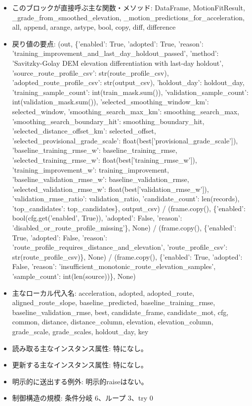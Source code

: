 \documentclass[a4paper,11pt]{article}
\begin{document}
\begin{itemize}[leftmargin=1.6em]
This stage calibrates the route observation, not vehicle mass or resistance.
The selected route stores the unscaled DEM grade. ``grade\_scale`` remains a
separately fitted model coefficient in the following motion fit.
              \item このブロックが直接呼ぶ主な関数・メソッド: DataFrame, MotionFitResult, \_grade\_from\_smoothed\_elevation, \_motion\_predictions\_for\_acceleration, all, append, arange, astype, bool, copy, diff, difference
              \item 戻り値の要点: (out, \{'enabled': True, 'adopted': True, 'reason': 'training\_improvement\_and\_last\_day\_holdout\_passed', 'method': 'Savitzky-Golay DEM elevation differentiation with last-day holdout', 'source\_route\_profile\_csv': str(route\_profile\_csv), 'adopted\_route\_profile\_csv': str(output\_csv), 'holdout\_day': holdout\_day, 'training\_sample\_count': int(train\_mask.sum()), 'validation\_sample\_count': int(validation\_mask.sum()), 'selected\_smoothing\_window\_km': selected\_window, 'smoothing\_search\_max\_km': smoothing\_search\_max, 'smoothing\_search\_boundary\_hit': smoothing\_boundary\_hit, 'selected\_distance\_offset\_km': selected\_offset, 'selected\_provisional\_grade\_scale': float(best['provisional\_grade\_scale']), 'baseline\_training\_rmse\_w': baseline\_training\_rmse, 'selected\_training\_rmse\_w': float(best['training\_rmse\_w']), 'training\_improvement\_w': training\_improvement, 'baseline\_validation\_rmse\_w': baseline\_validation\_rmse, 'selected\_validation\_rmse\_w': float(best['validation\_rmse\_w']), 'validation\_rmse\_ratio': validation\_ratio, 'candidate\_count': len(records), 'top\_candidates': top\_candidates\}, output\_csv) / (frame.copy(), \{'enabled': bool(cfg.get('enabled', True)), 'adopted': False, 'reason': 'disabled\_or\_route\_profile\_missing'\}, None) / (frame.copy(), \{'enabled': True, 'adopted': False, 'reason': 'route\_profile\_requires\_distance\_and\_elevation', 'route\_profile\_csv': str(route\_profile\_csv)\}, None) / (frame.copy(), \{'enabled': True, 'adopted': False, 'reason': 'insufficient\_monotonic\_route\_elevation\_samples', 'sample\_count': int(len(source))\}, None)
              \item 主なローカル代入名: acceleration, adopted, adopted\_route, aligned\_route\_slope, baseline\_predicted, baseline\_training\_rmse, baseline\_validation\_rmse, best, candidate\_frame, candidate\_mot, cfg, common, distance, distance\_column, elevation, elevation\_column, grade\_scale, grade\_scales, holdout\_day, key
              \item 読み取る主なインスタンス属性: 特になし。
              \item 更新する主なインスタンス属性: 特になし。
              \item 明示的に送出する例外: 明示的raiseはない。
              \item 制御構造の規模: 条件分岐 6、ループ 3、try 0
            \end{itemize}
\end{document}
